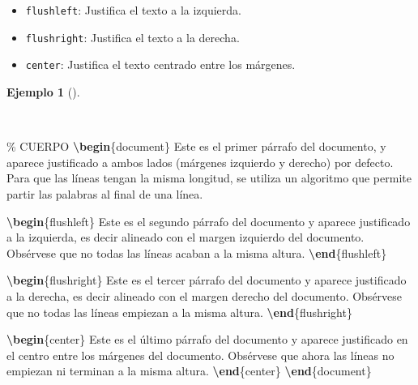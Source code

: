 \documentclass[
  a4paper,
]{scrreport}
\newenvironment{Shaded}{\begin{snugshade}}{\end{snugshade}}
\newcommand{\CommentTok}[1]{\textcolor[rgb]{0.37,0.37,0.37}{#1}}
\newcommand{\ExtensionTok}[1]{\textcolor[rgb]{0.00,0.23,0.31}{#1}}
\newcommand{\KeywordTok}[1]{\textcolor[rgb]{0.00,0.23,0.31}{\textbf{#1}}}
\newcommand{\NormalTok}[1]{\textcolor[rgb]{0.00,0.23,0.31}{#1}}
\providecommand{\tightlist}{%
  \setlength{\itemsep}{0pt}\setlength{\parskip}{0pt}}\usepackage{longtable,booktabs,array}
\theoremstyle{definition}
\newtheorem{example}{Ejemplo}[chapter]
\theoremstyle{remark}
\begin{document}
\begin{itemize}
\tightlist
\item
  \texttt{flushleft}: Justifica el texto a la izquierda.
\item
  \texttt{flushright}: Justifica el texto a la derecha.
\item
  \texttt{center}: Justifica el texto centrado entre los márgenes.
\end{itemize}

\begin{example}[]\protect\hypertarget{exm-justificacion}{}\label{exm-justificacion}

~

\begin{Shaded}
\begin{Highlighting}[]
\CommentTok{\% CUERPO}
\KeywordTok{\textbackslash{}begin}\NormalTok{\{}\ExtensionTok{document}\NormalTok{\}}
\NormalTok{Este es el primer párrafo del documento, y aparece justificado a ambos lados}
\NormalTok{(márgenes izquierdo y derecho) por defecto. Para que las líneas tengan la }
\NormalTok{misma longitud, se utiliza un algoritmo que permite partir las palabras al }
\NormalTok{final de una línea.}

\KeywordTok{\textbackslash{}begin}\NormalTok{\{}\ExtensionTok{flushleft}\NormalTok{\}}
\NormalTok{Este es el segundo párrafo del documento y aparece justificado a la }
\NormalTok{izquierda, es decir alineado con el margen izquierdo del documento. }
\NormalTok{Obsérvese que no todas las líneas acaban a la misma altura.}
\KeywordTok{\textbackslash{}end}\NormalTok{\{}\ExtensionTok{flushleft}\NormalTok{\}}

\KeywordTok{\textbackslash{}begin}\NormalTok{\{}\ExtensionTok{flushright}\NormalTok{\}}
\NormalTok{Este es el tercer párrafo del documento y aparece justificado a la derecha,}
\NormalTok{es decir alineado con el margen derecho del documento. Obsérvese que no }
\NormalTok{todas las líneas empiezan a la misma altura.}
\KeywordTok{\textbackslash{}end}\NormalTok{\{}\ExtensionTok{flushright}\NormalTok{\}}

\KeywordTok{\textbackslash{}begin}\NormalTok{\{}\ExtensionTok{center}\NormalTok{\}}
\NormalTok{Este es el último párrafo del documento y aparece justificado en el centro}
\NormalTok{entre los márgenes del documento. Obsérvese que ahora las líneas no }
\NormalTok{empiezan ni terminan a la misma altura. }
\KeywordTok{\textbackslash{}end}\NormalTok{\{}\ExtensionTok{center}\NormalTok{\}}
\KeywordTok{\textbackslash{}end}\NormalTok{\{}\ExtensionTok{document}\NormalTok{\}}
\end{Highlighting}
\end{Shaded}


\end{example}
\end{document}
